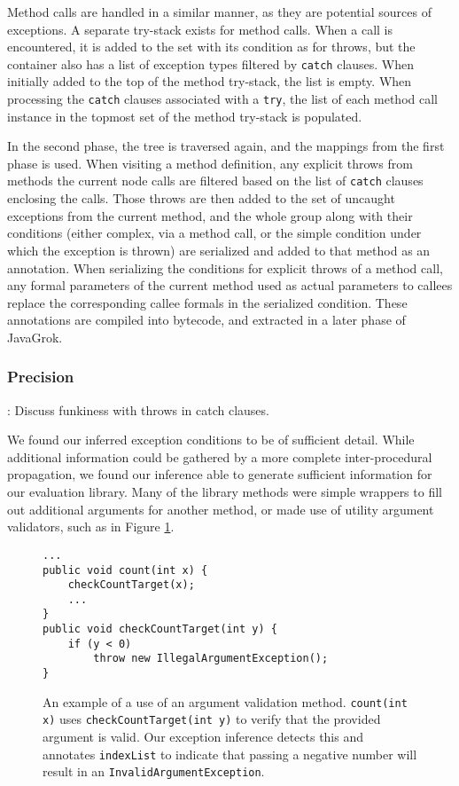 Method calls are handled in a similar manner, as they are potential sources of
exceptions.  A separate try-stack exists for method calls.  When a call is
encountered, it is added to the set with its condition as for throws, but the
container also has a list of exception types filtered by \texttt{catch} clauses.  When
initially added to the top of the method try-stack, the list is empty.  When
processing the \texttt{catch} clauses associated with a \texttt{try}, the list of each
method call instance in the topmost set of the method try-stack is populated. 

In the second phase, the tree is traversed again, and the mappings from the first
phase is used.  When visiting a method definition, any explicit throws from
methods the current node calls are filtered based on the list of \texttt{catch} clauses
enclosing the calls.  Those throws are then added to the set of uncaught
exceptions from the current method, and the whole group along with their
conditions (either complex, via a method call, or the simple condition under
which the exception is thrown) are serialized and added to that method as an
annotation.  When serializing the conditions for explicit throws of a method
call, any formal parameters of the current method used as actual parameters to
callees replace the corresponding callee formals in the serialized condition.
These annotations are compiled into bytecode, and extracted in a later phase of
JavaGrok.

\subsubsection{Precision}
{\LARGE: Discuss funkiness with throws in catch clauses.}

We found our inferred exception conditions to be of sufficient detail.  While
additional information could be gathered by a more complete inter-procedural
propagation, we found our inference able to generate sufficient information for
our evaluation library.  Many of the library methods were simple wrappers to
fill out additional arguments for another method, or made use of utility
argument validators, such as in Figure \ref{fig:argvalidate}.

\begin{figure}
\begin{verbatim}
...
public void count(int x) {
    checkCountTarget(x);
    ...
}
public void checkCountTarget(int y) {
    if (y < 0)
        throw new IllegalArgumentException();
}
\end{verbatim}
\caption{An example of a use of an argument validation method.
\texttt{count(int x)} uses \texttt{checkCountTarget(int y)} to verify that the
provided argument is valid.  Our exception inference detects this and annotates
\texttt{indexList} to indicate that passing a negative number will result in an
\texttt{InvalidArgumentException}.}
\label{fig:argvalidate}
\end{figure}

